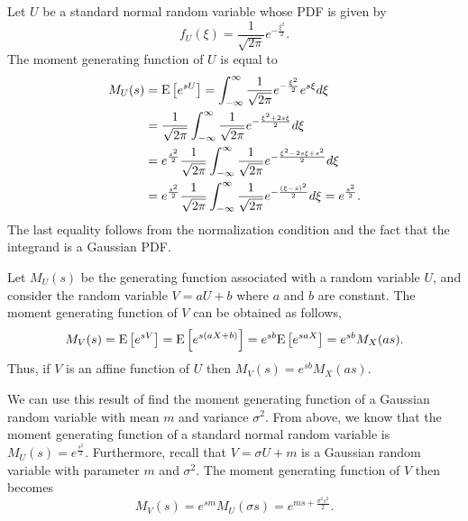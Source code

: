 \begin{example}
Let $U$ be a standard normal random variable whose PDF is given by
\begin{equation*}
f_U (\xi) = \frac{1}{\sqrt{2 \pi}} e^{- \frac{\xi^2}{2}}.
\end{equation*}
The moment generating function of $U$ is equal to
\begin{equation*}
\begin{split}
M_U (s) &= \mathrm{E} \left[ e^{sU} \right]
= \int_{- \infty}^{\infty} \frac{1}{\sqrt{2 \pi}} e^{- \frac{\xi^2}{2}} e^{s\xi} d\xi \\
&= \frac{1}{\sqrt{2 \pi}} \int_{- \infty}^{\infty}
\frac{1}{\sqrt{2 \pi}} e^{- \frac{\xi^2 + 2 s \xi}{2}} d\xi \\
&= e^{\frac{s^2}{2}} \frac{1}{\sqrt{2 \pi}} \int_{- \infty}^{\infty}
\frac{1}{\sqrt{2 \pi}} e^{- \frac{\xi^2 - 2 s \xi + s^2}{2}} d\xi \\
&= e^{\frac{s^2}{2}} \frac{1}{\sqrt{2 \pi}}
\int_{- \infty}^{\infty} \frac{1}{\sqrt{2 \pi}} e^{- \frac{(\xi - s)^2}{2}} d\xi
= e^{\frac{s^2}{2}} .
\end{split}
\end{equation*}
The last equality follows from the normalization condition and the fact that the integrand is a Gaussian PDF.
\end{example}

Let $M_U(s)$ be the generating function associated with a random variable $U$, and consider the random variable $V = aU + b$ where $a$ and $b$ are constant.
The moment generating function of $V$ can be obtained as follows,
\begin{equation*}
M_V (s) = \mathrm{E} \left[ e^{s V} \right]
= \mathrm{E} \left[ e^{s (aX + b)} \right]
= e^{sb} \mathrm{E} \left[ e^{saX} \right]
= e^{sb} M_X (as) .
\end{equation*}
Thus, if $V$ is an affine function of $U$ then $M_V (s) = e^{sb} M_X (as)$.

\begin{example}
We can use this result of find the moment generating function of a Gaussian random variable with mean $m$ and variance $\sigma^2$.
From above, we know that the moment generating function of a standard normal random variable is $M_U (s) = e^{\frac{s^2}{2}}$.
Furthermore, recall that $V = \sigma U + m$ is a Gaussian random variable with parameter $m$ and $\sigma^2$.
The moment generating function of $V$ then becomes
\begin{equation*}
M_V (s) = e^{sm} M_U (\sigma s) = e^{m s + \frac{\sigma^2 s^2}{2}} .
\end{equation*}
\end{example}

